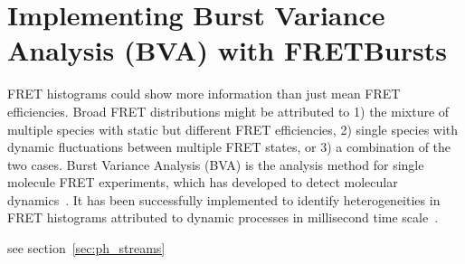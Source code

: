 \section{Implementing Burst Variance Analysis (BVA) with FRETBursts}

FRET histograms could show more information than just mean FRET efficiencies. Broad FRET distributions might be attributed to 1) the mixture of multiple species with static but different FRET efficiencies, 2) single species with dynamic fluctuations between multiple FRET states, or 3) a combination of the two cases. Burst Variance Analysis (BVA) is the analysis method for single molecule FRET experiments, which has developed to detect molecular dynamics~\cite{Torella_2011}. It has been successfully implemented to identify heterogeneities in FRET histograms attributed to dynamic processes in millisecond time scale~\cite{Torella_2011, Robb_2013}.

see section~\ref{sec:ph_streams}